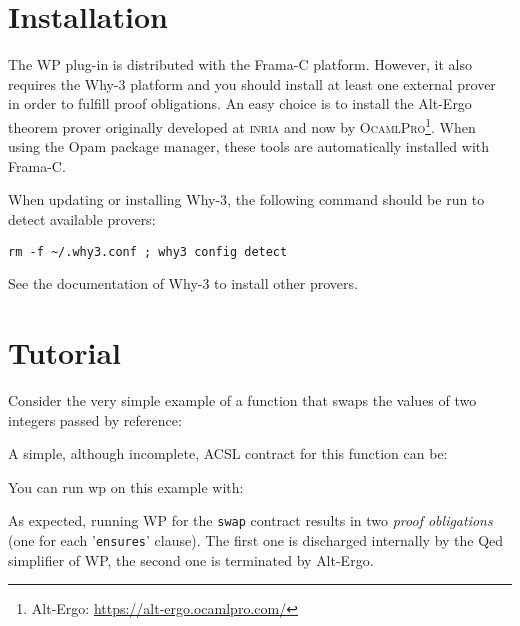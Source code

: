 \clearpage

\section{Installation}
\label{wp-install}

The \textsf{WP} plug-in is distributed with the \textsf{Frama-C}
platform. However, it also requires the \textsf{Why-3} platform and
you should install at least one external prover in
order to fulfill proof obligations. An easy choice is to install the
\textsf{Alt-Ergo} theorem prover originally developed at
\textsc{inria} and now by \textsc{OcamlPro}\footnote{\textsf{Alt-Ergo}:
  \url{https://alt-ergo.ocamlpro.com/}}. When using the \textsf{Opam} package
  manager, these tools are automatically installed with \textsf{Frama-C}.

When updating or installing \textsf{Why-3}, the following command should be
run to detect available provers:

\begin{lstlisting}[basicstyle=\ttfamily]
rm -f ~/.why3.conf ; why3 config detect
\end{lstlisting}

See the documentation of \textsf{Why-3} to install other provers.


\section{Tutorial}
\label{wp-tutorial}

Consider the very simple example of a function that swaps the values
of two integers passed by reference:


A simple, although incomplete, \textsf{ACSL} contract for this function can be:


You can run \textsf{wp} on this example with:

As expected, running \textsf{WP} for the \texttt{swap} contract
results in two \emph{proof obligations} (one for each '\verb+ensures+'
clause). The first one is discharged internally by the \textsf{Qed}
simplifier of \textsf{WP}, the second one is terminated by
\textsf{Alt-Ergo}.

